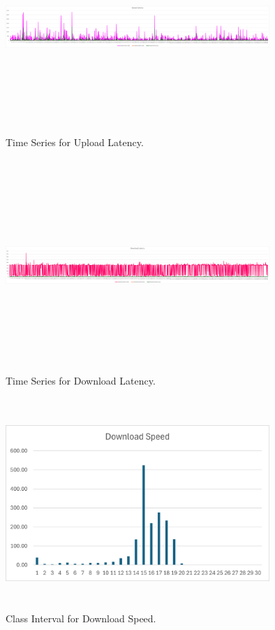 \documentclass[conference]{IEEEtran}
\begin{document}
\begin{figure}[htbp]
    \centerline{\includegraphics[width=10cm,height=8cm,keepaspectratio]{Figures/Picture22.png}}
    \caption{Time Series for Upload Latency.}
    \label{fig13}
\end{figure}

\begin{figure}[htbp]
    \centerline{\includegraphics[width=10cm,height=8cm,keepaspectratio]{Figures/Picture23.png}}
    \caption{Time Series for Download Latency.}
    \label{fig14}
\end{figure}

\begin{figure}[htbp]
    \centerline{\includegraphics[width=10cm,height=8cm,keepaspectratio]{Figures/Picture24.png}}
    \caption{Class Interval for Download Speed.}
    \label{fig15}
\end{figure}
\end{document}
